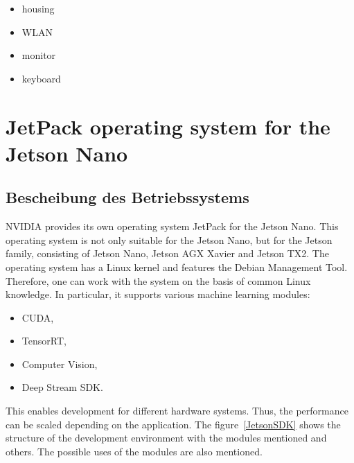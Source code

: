 \begin{itemize}
    \item housing
    \item WLAN
    \item monitor
    \item keyboard
\end{itemize}


\section{JetPack operating system for the Jetson Nano}

\subsection{Bescheibung des Betriebssystems}

NVIDIA provides its own operating system \glqq JetPack\grqq{} for the Jetson Nano. This operating system is not only suitable for the Jetson Nano, but for the Jetson family, consisting of Jetson Nano, Jetson AGX Xavier and Jetson TX2.
The operating system has a Linux kernel and features the Debian Management Tool. Therefore, one can work with the system on the basis of common Linux knowledge. In particular, it supports various machine learning modules:

\begin{itemize}
  \item CUDA, 
  \item TensorRT, 
  \item Computer Vision, 
  \item Deep Stream SDK.
\end{itemize}  

This enables development for different hardware systems. Thus, the performance can be scaled depending on the application. \cite{Artamonov:2018,jetpack:2021} The figure~\ref{JetsonSDK} shows the structure of the development environment with the modules mentioned and others. The possible uses of the modules are also mentioned.




